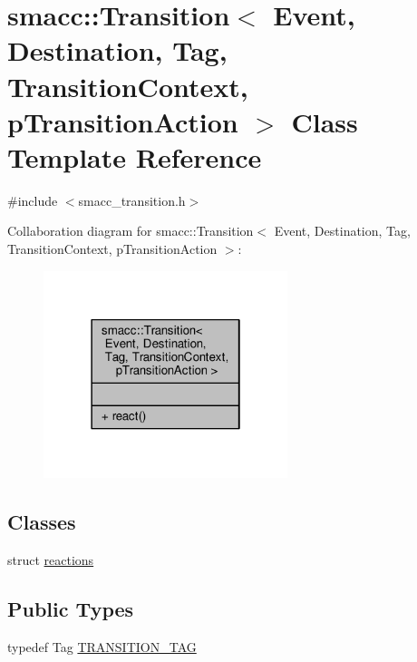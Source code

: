 \hypertarget{classsmacc_1_1Transition}{}\section{smacc\+:\+:Transition$<$ Event, Destination, Tag, Transition\+Context, p\+Transition\+Action $>$ Class Template Reference}
\label{classsmacc_1_1Transition}


{\ttfamily \#include $<$smacc\+\_\+transition.\+h$>$}



Collaboration diagram for smacc\+:\+:Transition$<$ Event, Destination, Tag, Transition\+Context, p\+Transition\+Action $>$\+:\nopagebreak
\begin{figure}[H]
\begin{center}
\leavevmode
\includegraphics[width=202pt]{classsmacc_1_1Transition__coll__graph}
\end{center}
\end{figure}
\subsection*{Classes}
\begin{DoxyCompactItemize}
\item 
struct \hyperlink{structsmacc_1_1Transition_1_1reactions}{reactions}
\end{DoxyCompactItemize}
\subsection*{Public Types}
\begin{DoxyCompactItemize}
\item 
typedef Tag \hyperlink{classsmacc_1_1Transition_a672e883135344c4aea140381dd4d1c1d}{T\+R\+A\+N\+S\+I\+T\+I\+O\+N\+\_\+\+T\+AG}
\end{DoxyCompactItemize}
